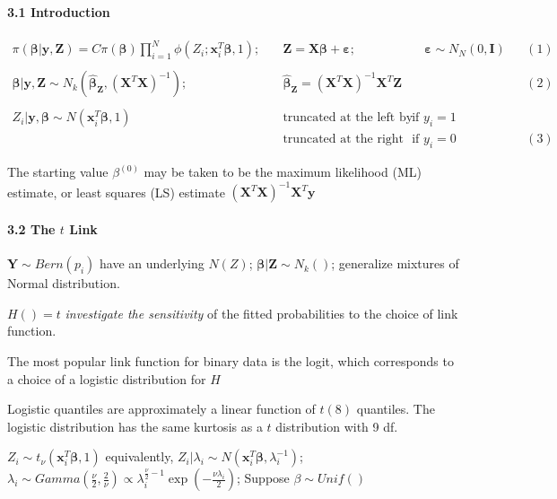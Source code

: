 \documentclass[
]{article}
\begin{document}
\hypertarget{introduction-1}{%
\paragraph{3.1 Introduction}\label{introduction-1}}

\[
\begin{align} 
\pi(\boldsymbol{\beta|y,Z}) = C\pi(\boldsymbol{\beta})\prod_{i=1}^{N}\phi (Z_{i};\mathbf{x}_i^T\boldsymbol{\beta},1); &\quad\mathbf{Z}=\mathbf{X}\boldsymbol{\beta+\varepsilon}; &\quad \boldsymbol{\varepsilon}\sim N_N(0,\mathbf{I})&&(1)\\
\\
\boldsymbol{\beta}|\mathbf{y,Z}\sim N_k(\boldsymbol{\hat\beta_Z},(\mathbf{X}^T\mathbf{X})^{-1}); &\quad\boldsymbol{\hat\beta_Z}=(\mathbf{X}^T\mathbf{X})^{-1}\mathbf{X}^T\mathbf{Z}&&& (2)\\
\\
Z_i|\boldsymbol{y,\beta}\sim N(\mathbf{x}_i^T\boldsymbol{\beta},1) &\quad\text{truncated at the left by 0} & \text{if } y_i=1 &&\\
 &\quad\text{truncated at the right by 0} & \text{if } y_i=0 &&(3)
\end{align}
\]

The starting value \(\beta^{(0)}\) may be taken to be the maximum
likelihood (ML) estimate, or least squares (LS) estimate
\((\mathbf{X}^T\mathbf{X})^{-1}\mathbf{X}^T\mathbf{y}\)

\hypertarget{the-t-link}{%
\paragraph{\texorpdfstring{3.2 The \(t\)
Link}{3.2 The t Link}}\label{the-t-link}}

\(\mathbf{Y}\sim Bern(p_i)\) have an underlying \(N(Z)\);
\(\boldsymbol{\beta}|\mathbf{Z}\sim N_k()\); generalize mixtures of
Normal distribution.

\(H()=t\) \emph{investigate the sensitivity} of the fitted probabilities
to the choice of link function.

The most popular link function for binary data is the logit, which
corresponds to a choice of a logistic distribution for \(H\)

Logistic quantiles are approximately a linear function of \(t(8)\)
quantiles. The logistic distribution has the same kurtosis as a \(t\)
distribution with 9 df.

\(Z_i\sim t_{\nu}(\mathbf{x}_i^T\boldsymbol{\beta},1)\) equivalently,
\(Z_i|\lambda_i\sim N(\mathbf{x}_i^T\boldsymbol{\beta},\lambda_i^{-1})\);
\(\lambda_i\sim Gamma(\frac{\nu}{2},\frac{2}{\nu})\propto\lambda_i^{\frac{\nu}{2}-1}\exp(-\frac{\nu\lambda_i}{2})\);
Suppose \(\beta\sim Unif()\)
\end{document}
